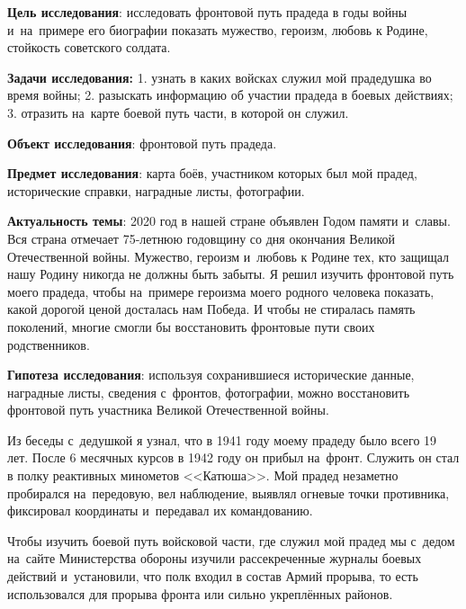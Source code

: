 


\makeProcTitleSchool



\textbf{Цель исследования}: исследовать фронтовой путь прадеда в годы войны и~на~примере его биографии показать мужество, героизм, любовь к Родине, стойкость советского солдата.

\textbf{Задачи исследования:} 1. узнать в каких войсках служил мой прадедушка во время войны; 2. разыскать информацию об участии прадеда в боевых действиях; 3. отразить на~карте боевой путь части, в которой он служил.

\textbf{Объект исследования}: фронтовой путь прадеда.

\textbf{Предмет исследования}: карта боёв, участником которых был мой прадед, исторические справки, наградные листы, фотографии.

\textbf{Актуальность темы}: 2020 год в нашей стране объявлен Годом памяти и~славы. Вся страна отмечает 75-летнюю годовщину со дня окончания Великой Отечественной войны. Мужество, героизм и~любовь к Родине тех, кто защищал нашу Родину никогда не должны быть забыты. Я решил изучить фронтовой путь моего прадеда, чтобы на~примере героизма моего родного человека показать, какой дорогой ценой досталась нам Победа. И чтобы не стиралась память поколений, многие смогли бы восстановить фронтовые пути своих родственников.

\textbf{Гипотеза исследования}: используя сохранившиеся исторические данные, наградные листы, сведения с~фронтов, фотографии, можно восстановить фронтовой путь участника Великой Отечественной войны.

Из беседы с~дедушкой я узнал, что в 1941 году моему прадеду было всего 19 лет. После 6 месячных курсов в 1942 году он прибыл на~фронт. Служить он стал в полку реактивных минометов <<Катюша>>. Мой прадед незаметно пробирался на~передовую, вел наблюдение, выявлял огневые точки противника, фиксировал координаты и~передавал их командованию.

Чтобы изучить боевой путь войсковой части, где служил мой прадед мы с~дедом на~сайте Министерства обороны изучили рассекреченные журналы боевых действий и~установили, что полк входил в состав Армий прорыва, то есть использовался для прорыва фронта или сильно укреплённых районов.


